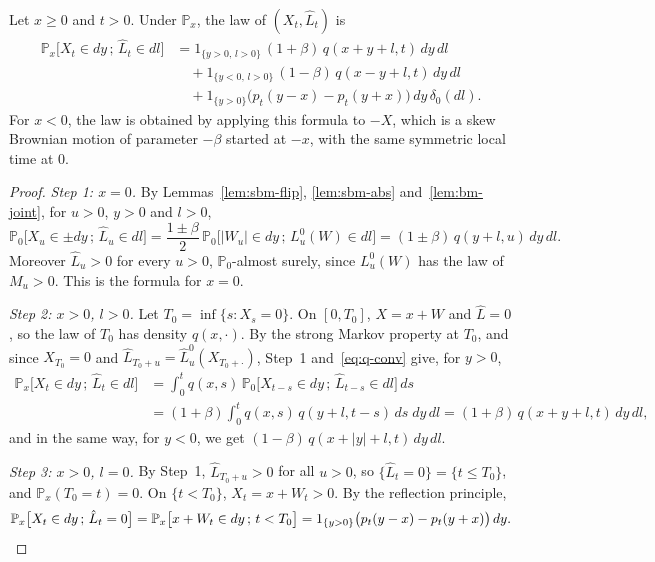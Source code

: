 \begin{proposition}\label{prop:sbm-joint}
	Let $x\geqslant0$ and $t>0$. Under $\mathbb{P}_x$, the law of
	$(X_t,\hat{L}_t)$ is
	\begin{align*}
		\mathbb{P}_x\bigl[X_t\in dy\,;\,\hat{L}_t\in dl\bigr]
		 & = 1_{\{y>0,\,l>0\}}\,(1+\beta)\,q(x+y+l,t)\,dy\,dl          \\
		 & \quad + 1_{\{y<0,\,l>0\}}\,(1-\beta)\,q(x-y+l,t)\,dy\,dl     \\
		 & \quad + 1_{\{y>0\}}\bigl(p_t(y-x) - p_t(y+x)\bigr)\,dy\,\delta_0(dl).
	\end{align*}
	For $x<0$, the law is obtained by applying this formula to $-X$, which is a
	skew Brownian motion of parameter $-\beta$ started at $-x$, with the same
	symmetric local time at $0$.
\end{proposition}
\begin{proof}
	\emph{Step 1: $x = 0$.} By Lemmas~\ref{lem:sbm-flip}, \ref{lem:sbm-abs}
	and~\ref{lem:bm-joint}, for $u>0$, $y>0$ and $l>0$,
	\[
		\mathbb{P}_0\bigl[X_u\in\pm dy\,;\,\hat{L}_u\in dl\bigr]
		= \frac{1\pm\beta}{2}\,\mathbb{P}_0\bigl[|W_u|\in dy\,;\,L^0_u(W)\in dl\bigr]
		= (1\pm\beta)\,q(y+l,u)\,dy\,dl .
	\]
	Moreover $\hat{L}_u>0$ for every $u>0$, $\mathbb{P}_0$-almost surely, since
	$L^0_u(W)$ has the law of $M_u>0$. This is the formula for $x=0$.

	\emph{Step 2: $x>0$, $l>0$.} Let $T_0 = \inf\{s : X_s = 0\}$. On
	$[0,T_0]$, $X = x + W$ and $\hat{L} = 0$, so the law of $T_0$ has density
	$q(x,\cdot)$. By the strong Markov property at $T_0$, and since
	$X_{T_0} = 0$ and $\hat{L}_{T_0+u} = \hat{L}^0_u(X_{T_0+\cdot})$, Step~1
	and~\eqref{eq:q-conv} give, for $y>0$,
	\begin{align*}
		\mathbb{P}_x\bigl[X_t\in dy\,;\,\hat{L}_t\in dl\bigr]
		 & = \int_0^t q(x,s)\,\mathbb{P}_0\bigl[X_{t-s}\in dy\,;\,\hat{L}_{t-s}\in dl\bigr]\,ds \\
		 & = (1+\beta)\int_0^t q(x,s)\,q(y+l,t-s)\,ds\;dy\,dl
		= (1+\beta)\,q(x+y+l,t)\,dy\,dl,
	\end{align*}
	and in the same way, for $y<0$, we get $(1-\beta)\,q(x+|y|+l,t)\,dy\,dl$.

	\emph{Step 3: $x>0$, $l=0$.} By Step~1, $\hat{L}_{T_0+u}>0$ for all $u>0$,
	so $\{\hat{L}_t = 0\} = \{t\leqslant T_0\}$, and
	$\mathbb{P}_x(T_0 = t) = 0$. On $\{t<T_0\}$, $X_t = x + W_t > 0$. By the
	reflection principle,
	\[
		\mathbb{P}_x\bigl[X_t\in dy\,;\,\hat{L}_t = 0\bigr]
		= \mathbb{P}_x\bigl[x+W_t\in dy\,;\,t<T_0\bigr]
		= 1_{\{y>0\}}\bigl(p_t(y-x) - p_t(y+x)\bigr)\,dy . \qedhere
	\]
\end{proof}

